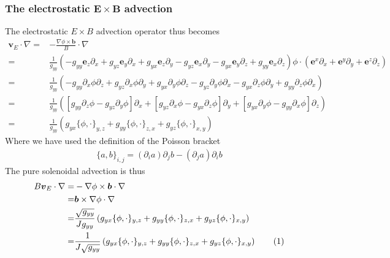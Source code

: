 \documentclass[12pt]{article}
\def\L{\left}
\def\R{\right}
\newcommand{\ve}[1]{\ensuremath{\boldsymbol{#1}}}
\newcommand\numberthis{\addtocounter{equation}{1}\tag{\theequation}}
\begin{document}
\subsubsection{The electrostatic \texorpdfstring{$\ve{E}\times \ve{B}$}{ExB}
	       advection}
%
The electrostatic $E\times B$ advection operator thus becomes
%
\begin{align*}
    \ve{v}_E\cdot\nabla
    =& -\frac{\nabla\phi\times\ve{b}}{B}\cdot\nabla\\
    =&\frac{1}{g_{yy}}
	       \L(
	       - g_{yy}\ve{e}_z\partial_x
	       + g_{yz}\ve{e}_y\partial_x
	       + g_{yx}\ve{e}_z\partial_y
	       - g_{yz}\ve{e}_x\partial_y
	       - g_{yx}\ve{e}_y\partial_z
	       + g_{yy}\ve{e}_x\partial_z
	       \R)
	       \phi
       \cdot\L(\ve{e}^x\partial_x + \ve{e}^y\partial_y + \ve{e}^z\partial_z\R)\\
    =& \frac{1}{g_{yy}}
	       \L(
	       - g_{yy}\partial_x\phi\partial_z
	       + g_{yz}\partial_x\phi\partial_y
	       + g_{yx}\partial_y\phi\partial_z
	       - g_{yz}\partial_y\phi\partial_x
	       - g_{yx}\partial_z\phi\partial_y
	       + g_{yy}\partial_z\phi\partial_x
	       \R)\\
    =& \frac{1}{g_{yy}}
	       \L(
	         \L[
	           g_{yy}\partial_z\phi
	         - g_{yz}\partial_y\phi
	         \R]\partial_x
	       +
	         \L[
	           g_{yz}\partial_x\phi
	         - g_{yx}\partial_z\phi
	         \R]\partial_y
	       +
	         \L[
	           g_{yx}\partial_y\phi
	         - g_{yy}\partial_x\phi
	         \R]\partial_z
	       \R)\\
    =& \frac{1}{g_{yy}}
               \L(
                 g_{yx}\{\phi, \cdot\}_{y,z}
                 +
                 g_{yy}\{\phi, \cdot\}_{z,x}
                 +
                 g_{yz}\{\phi, \cdot\}_{x,y}
               \R)
\end{align*}
%
Where we have used the definition of the Poisson bracket
%
\begin{align*}
    \{a, b\}_{i,j} =
      \L(\partial_i a\R) \partial_j b
    - \L(\partial_j a\R) \partial_i b
\end{align*}
%
The pure solenoidal advection is thus
%
\begin{align*}
    B\ve{v}_E\cdot\nabla
    =& -\nabla\phi\times\ve{b}\cdot\nabla\\
    =& \ve{b} \times \nabla\phi\cdot\nabla\\
    =& \frac{\sqrt{g_{yy}}}{Jg_{yy}}
               \L(
                 g_{yx}\{\phi, \cdot\}_{y,z}
                 +
                 g_{yy}\{\phi, \cdot\}_{z,x}
                 +
                 g_{yz}\{\phi, \cdot\}_{x,y}
               \R)
               \\
    =& \frac{1}{J\sqrt{g_{yy}}}
               \L(
                 g_{yx}\{\phi, \cdot\}_{y,z}
                 +
                 g_{yy}\{\phi, \cdot\}_{z,x}
                 +
                 g_{yz}\{\phi, \cdot\}_{x,y}
               \R)
	       \numberthis
	       \label{eq:brackets}
\end{align*}
\end{document}
